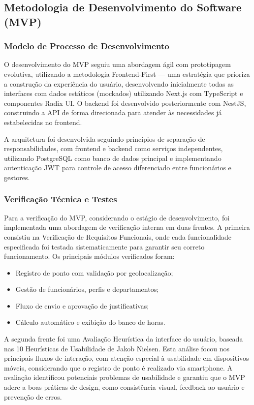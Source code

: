 \subsection{Metodologia de Desenvolvimento do Software (MVP)}

\subsubsection{Modelo de Processo de Desenvolvimento}

O desenvolvimento do MVP seguiu uma abordagem ágil com prototipagem evolutiva, utilizando a metodologia Frontend-First — uma estratégia que prioriza a construção da experiência do usuário, desenvolvendo inicialmente todas as interfaces com dados estáticos (mockados) utilizando Next.js com TypeScript e componentes Radix UI. O backend foi desenvolvido posteriormente com NestJS, construindo a API de forma direcionada para atender às necessidades já estabelecidas no frontend.

A arquitetura foi desenvolvida seguindo princípios de separação de responsabilidades, com frontend e backend como serviços independentes, utilizando PostgreSQL como banco de dados principal e implementando autenticação JWT para controle de acesso diferenciado entre funcionários e gestores.

\subsubsection{Verificação Técnica e Testes} 

Para a verificação do MVP, considerando o estágio de desenvolvimento, foi implementada uma abordagem de verificação interna em duas frentes. A primeira consistiu na Verificação de Requisitos Funcionais, onde cada funcionalidade especificada foi testada sistematicamente para garantir seu correto funcionamento. Os principais módulos verificados foram:
\begin{itemize}
    \item Registro de ponto com validação por geolocalização;
    \item Gestão de funcionários, perfis e departamentos;
    \item Fluxo de envio e aprovação de justificativas;
    \item Cálculo automático e exibição do banco de horas.
\end{itemize}

A segunda frente foi uma Avaliação Heurística da interface do usuário, baseada nas 10 Heurísticas de Usabilidade de Jakob Nielsen. Esta análise focou nos principais fluxos de interação, com atenção especial à usabilidade em dispositivos móveis, considerando que o registro de ponto é realizado via smartphone. A avaliação identificou potenciais problemas de usabilidade e garantiu que o MVP adere a boas práticas de design, como consistência visual, feedback ao usuário e prevenção de erros.

